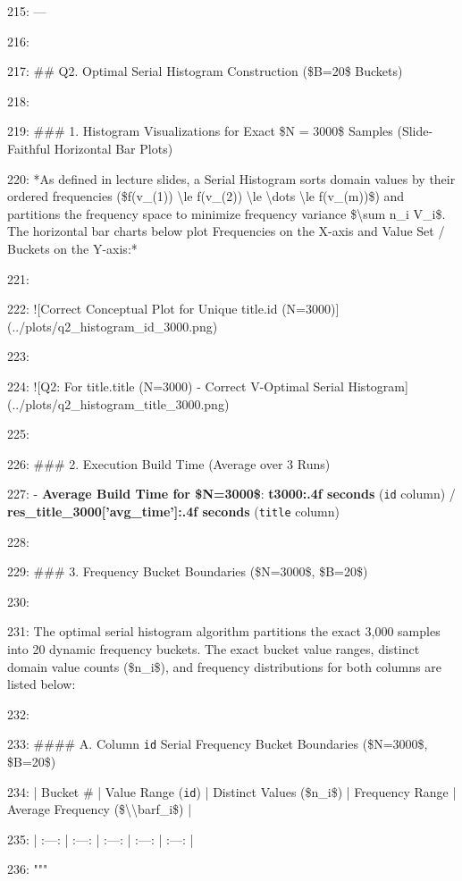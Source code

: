 \documentclass[11pt,a4paper]{article}
\begin{document}
{215: ---

216:

217: \#\# Q2. Optimal Serial Histogram Construction (\$B=20\$ Buckets)

218:

219: \#\#\# 1. Histogram Visualizations for Exact \$N = 3000\$ Samples (Slide-Faithful Horizontal Bar Plots)

220: *As defined in lecture slides, a Serial Histogram sorts domain values by their ordered frequencies (\$f(v\_{{(1)}}) \textbackslash{}le f(v\_{{(2)}}) \textbackslash{}le \textbackslash{}dots \textbackslash{}le f(v\_{{(m)}})\$) and partitions the frequency space to minimize frequency variance \$\textbackslash{}sum n\_i V\_i\$. The horizontal bar charts below plot Frequencies on the X-axis and Value Set / Buckets on the Y-axis:*

221:

222: ![Correct Conceptual Plot for Unique title.id (N=3000)](../plots/q2\_histogram\_id\_3000.png)

223:

224: ![Q2: For title.title (N=3000) - Correct V-Optimal Serial Histogram](../plots/q2\_histogram\_title\_3000.png)

225:

226: \#\#\# 2. Execution Build Time (Average over 3 Runs)

227: - \textbf{Average Build Time for \$N=3000\$}: \textbf{{t3000:.4f} seconds} (\texttt{id} column) / \textbf{{res\_title\_3000['avg\_time']:.4f} seconds} (\texttt{title} column)

228:

229: \#\#\# 3. Frequency Bucket Boundaries (\$N=3000\$, \$B=20\$)

230:

231: The optimal serial histogram algorithm partitions the exact 3,000 samples into 20 dynamic frequency buckets. The exact bucket value ranges, distinct domain value counts (\$n\_i\$), and frequency distributions for both columns are listed below:

232:

233: \#\#\#\# A. Column \texttt{id} Serial Frequency Bucket Boundaries (\$N=3000\$, \$B=20\$)

234: | Bucket \# | Value Range (\texttt{id}) | Distinct Values (\$n\_i\$) | Frequency Range | Average Frequency (\$\textbackslash{}\textbackslash{}bar{{f}}\_i\$) |

235: | :---: | :---: | :---: | :---: | :---: |

236: """

}
\end{document}
